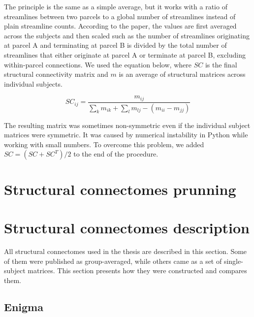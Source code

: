 The principle is the same as a simple average, but it works with a ratio of streamlines between two parcels to a global number of streamlines instead of plain streamline counts. According to the paper, the values are first averaged across the subjects and then scaled such as the number of streamlines originating at parcel A and terminating at parcel B is divided by the total number of streamlines that either originate at parcel A or terminate at parcel B, excluding within-parcel connections. \cite{rosen_whole-cortex_2021} We used the equation below, where $SC$ is the final structural connectivity matrix and $m$ is an average of structural matrices across individual subjects.

$$
SC_{ij} = \frac{m_{ij}}{\sum_k m_{ik} + \sum_l m_{lj} - (m_{ii} - m_{jj})}
$$

The resulting matrix was sometimes non-symmetric even if the individual subject matrices were symmetric. It was caused by numerical instability in Python while working with small numbers. To overcome this problem, we added $SC = (SC + SC^T) /2$ to the end of the procedure.

\section{Structural connectomes prunning}


\section{Structural connectomes description}

All structural connectomes used in the thesis are described in this section. Some of them were published as group-averaged, while others came as a set of single-subject matrices. This section presents how they were constructed and compares them. 

\subsection{Enigma}

